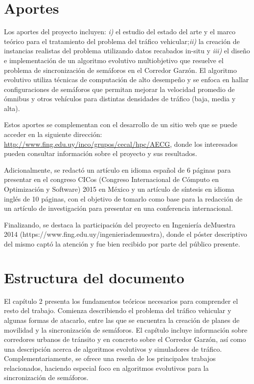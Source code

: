\section{Aportes}
Los aportes del proyecto incluyen: \textit{i)} el estudio del estado del arte y el marco teórico para el tratamiento del problema del tráfico vehicular;\textit{ii)} la creación de instancias realistas del problema utilizando datos recabados in-situ y \textit{iii)} el diseño e implementación de un algoritmo evolutivo multiobjetivo que resuelve el problema de sincronización de semáforos en el Corredor Garzón. El algoritmo evolutivo utiliza técnicas de computación de alto desempeño y se enfoca en hallar configuraciones de semáforos que permitan mejorar la velocidad promedio de ómnibus y otros vehículos para distintas densidades de tráfico (baja, media y alta). 

Estos aportes se complementan con el desarrollo de un sitio web que se puede acceder en la siguiente dirección: \url{http://www.fing.edu.uy/inco/grupos/cecal/hpc/AECG}, donde los interesados pueden consultar información sobre el proyecto y sus resultados. 

Adicionalmente, se redactó un artículo en idioma español de 6 páginas para presentar en el congreso CICos (Congreso Internacional de Cómputo en Optimización y Software) 2015 en México y un artículo de síntesis en idioma inglés de 10 páginas, con el objetivo de tomarlo como base para la redacción de un artículo de investigación para presentar en una conferencia internacional. 

Finalizando, se destaca la participación del proyecto en Ingeniería deMuestra 2014 (https://www.fing.edu.uy/ingenieriademuestra), donde el póster descriptivo del mismo captó la atención y fue bien recibido por parte del público presente.



\section{Estructura del documento}
El capítulo 2 presenta los fundamentos teóricos necesarios para comprender el resto del trabajo. Comienza describiendo el problema del tráfico vehicular y algunas formas de atacarlo, entre las que se encuentra la creación de planes de movilidad y la sincronización de semáforos. El capítulo incluye información sobre corredores urbanos de tránsito y en concreto sobre el Corredor Garzón, así como una descripción acerca de algoritmos evolutivos y simuladores de tráfico. Complementariamente, se ofrece una reseña de los principales trabajos relacionados, haciendo especial foco en algoritmos evolutivos para la sincronización de semáforos.

